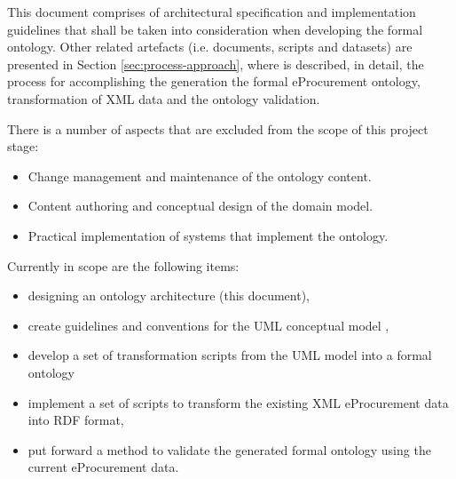 	This document comprises of architectural specification and implementation guidelines that shall be taken into consideration when developing the formal ontology. Other related artefacts (i.e. documents, scripts and datasets) are presented in Section \ref{sec:process-approach}, where is described, in detail, the process for accomplishing the generation the formal eProcurement ontology, transformation of XML data and the ontology validation.
	
	There is a number of aspects that are excluded from the scope of this project stage:	
	\begin{itemize}
		\item Change management and maintenance of the ontology content.
		\item Content authoring and conceptual design of the domain model.
		\item Practical implementation of systems that implement the ontology.
	\end{itemize}
	
	Currently in scope are the following items:
	\begin{itemize}
		\item designing an ontology architecture (this document),
		\item create guidelines and conventions for the UML conceptual model \citep{costetchi2020b}, 
		\item develop a set of transformation scripts from the UML model into a formal ontology
		\item implement a set of scripts to transform the existing XML eProcurement data into RDF format,
		\item put forward a method to validate the generated formal ontology using the current eProcurement data.
	\end{itemize}